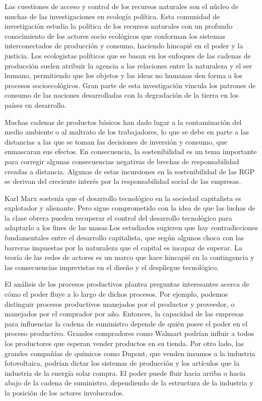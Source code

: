 \documentclass{article}
\begin{document}
Las cuestiones de acceso y control de los recursos naturales son el núcleo de muchas de las investigaciones en ecología política. Esta comunidad de investigación estudia la política de los recursos naturales con un profundo conocimiento de los actores socio ecológicos que conforman los sistemas interconectados de producción y consumo, haciendo hincapié en el poder y la justicia. Los ecologistas políticos que se basan en los enfoques de las cadenas de producción suelen atribuir la agencia a las relaciones entre la naturaleza y el ser humano, permitiendo que los objetos y las ideas no humanas den forma a los procesos socioecológicos. Gran parte de esta investigación vincula los patrones de consumo de las naciones desarrolladas con la degradación de la tierra en los países en desarrollo.


Muchas cadenas de productos básicos han dado lugar a la contaminación del medio ambiente o al maltrato de los trabajadores, lo que se debe en parte a las distancias a las que se toman las decisiones de inversión y consumo, que enmascaran sus efectos. En consecuencia, la sostenibilidad es un tema importante para corregir algunas consecuencias negativas de brechas de responsabilidad creadas a distancia. Algunas de estas incursiones en la sostenibilidad de las RGP se derivan del creciente interés por la responsabilidad social de las empresas.


Karl Marx sostenía que el desarrollo tecnológico en la sociedad capitalista es explotador y alienante. Pero sigue comprometido con la idea de que las luchas de la clase obrera pueden recuperar el control del desarrollo tecnológico para adaptarlo a los fines de las masas.Los estudiados sugieren que hay contradicciones fundamentales entre el desarrollo capitalista, que según algunos choca con las barreras impuestas por la naturaleza que el capital es incapaz de superar. La teoría de las redes de actores es un marco que hace hincapié en la contingencia y las consecuencias imprevistas en el diseño y el despliegue tecnológico.


El análisis de los procesos productivos plantea preguntas interesantes acerca de cómo el poder fluye a lo largo de dichos procesos. Por ejemplo, podemos distinguir procesos productivos manejados por el productor y proveedor, o manejados por el comprador por año. Entonces, la capacidad de las empresas para influenciar la cadena de suministro depende de quién posee el poder en el proceso productivo. Grandes compradores como Walmart podrían influir a todos los productores que esperan vender productos en su tienda. Por otro lado, las grandes compañías de químicos como Dupont, que venden insumos a la industria fotovoltaica, podrían dictar los sistemas de producción y los artículos que la industria de la energía solar compra. El poder puede fluir hacia arriba o hacia abajo de la cadena de suministro, dependiendo de la estructura de la industria y la posición de los actores involucrados.
\end{document}
